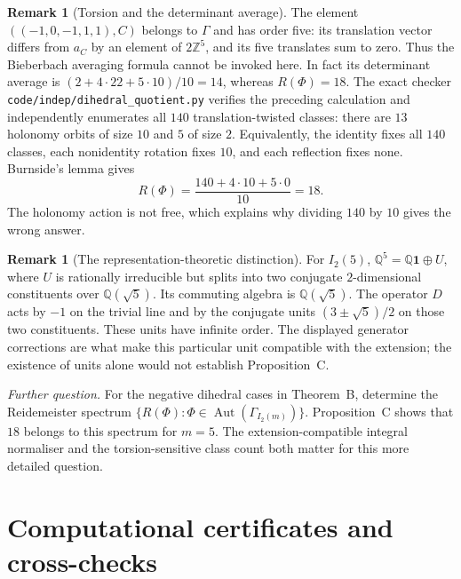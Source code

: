 \documentclass[11pt]{amsart}
\theoremstyle{definition}
\newtheorem{remark}[theorem]{Remark}
\newcommand{\Z}{\mathbb{Z}}
\newcommand{\Q}{\mathbb{Q}}
\newcommand{\Aut}{\operatorname{Aut}}
\begin{document}
\begin{remark}[Torsion and the determinant average]\label{rem:dihedral-average}
The element $((-1,0,-1,1,1),C)$ belongs to $\Gamma$ and has order five: its translation vector differs
from $a_C$ by an element of $2\Z^5$, and its five translates sum to zero. Thus the Bieberbach averaging
formula \cite[Thm.~3.4]{DKT19} cannot be invoked here. In fact its determinant average is
$(2+4\cdot22+5\cdot10)/10=14$, whereas $R(\Phi)=18$.
The exact checker \texttt{code/indep/dihedral\_quotient.py} verifies the preceding calculation and independently
enumerates all $140$ translation-twisted classes: there are $13$ holonomy orbits of size $10$ and $5$ of size $2$.
Equivalently, the identity fixes all $140$ classes, each nonidentity rotation fixes $10$, and each
reflection fixes none. Burnside's lemma gives
\[R(\Phi)=\frac{140+4\cdot10+5\cdot0}{10}=18.\]
The holonomy action is not free, which explains why dividing $140$ by $10$ gives the wrong answer.
\end{remark}

\begin{remark}[The representation-theoretic distinction]
For $I_2(5)$, $\Q^5=\Q\mathbf1\oplus U$, where $U$ is rationally irreducible but splits into two conjugate
$2$-dimensional constituents over $\Q(\sqrt5)$. Its commuting algebra is $\Q(\sqrt5)$.
The operator $D$ acts by $-1$ on the trivial line and by the conjugate units
$(3\pm\sqrt5)/2$ on those two constituents. These units have infinite order. The displayed generator
corrections are what make this particular unit compatible with the extension; the existence of units
alone would not establish Proposition~C.
\end{remark}

\smallskip\noindent\emph{Further question.} For the negative dihedral cases in Theorem~B, determine the
Reidemeister spectrum
$\{R(\Phi):\Phi\in\Aut(\Gamma_{I_2(m)})\}$. Proposition~C shows that $18$ belongs to this spectrum for
$m=5$. The extension-compatible integral normaliser and the torsion-sensitive class count both matter
for this more detailed question.

\appendix
\section{Computational certificates and cross-checks}\label{app:comp}
\end{document}
